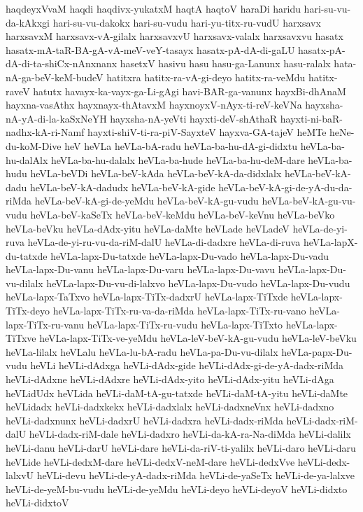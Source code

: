 {haqdeyxVvaM
haqdi
haqdivx-yukatxM
haqtA
haqtoV
haraDi
haridu
hari-su-vu-da-kAkxgi
hari-su-vu-dakokx
hari-su-vudu
hari-yu-titx-ru-vudU
harxsavx
harxsavxM
harxsavx-vA-gilalx
harxsavxvU
harxsavx-valalx
harxsavxvu
hasatx
hasatx-mA-taR-BA-gA-vA-meV-veY-tasayx
hasatx-pA-dA-di-gaLU
hasatx-pA-dA-di-ta-shiCx-nAnxnanx
hasetxV
hasivu
hasu
hasu-ga-Lanunx
hasu-ralalx
hata-nA-ga-beV-keM-budeV
hatitxra
hatitx-ra-vA-gi-deyo
hatitx-ra-veMdu
hatitx-raveV
hatutx
havayx-ka-vayx-ga-Li-gAgi
havi-BAR-ga-vanunx
hayxBi-dhAnaM
hayxna-vasAthx
hayxnayx-thAtavxM
hayxnoyxV-nAyx-ti-reV-keVNa
hayxsha-nA-yA-di-la-kaSxNeYH
hayxsha-nA-yeVti
hayxti-deV-shAthaR
hayxti-ni-baR-nadhx-kA-ri-Namf
hayxti-shiV-ti-ra-piV-SayxteV
hayxva-GA-tajeV
heMTe
heNe-du-koM-Dive
heV
heVLa
heVLa-bA-radu
heVLa-ba-hu-dA-gi-didxtu
heVLa-ba-hu-dalAlx
heVLa-ba-hu-dalalx
heVLa-ba-hude
heVLa-ba-hu-deM-dare
heVLa-ba-hudu
heVLa-beVDi
heVLa-beV-kAda
heVLa-beV-kA-da-didxlalx
heVLa-beV-kA-dadu
heVLa-beV-kA-dadudx
heVLa-beV-kA-gide
heVLa-beV-kA-gi-de-yA-du-da-riMda
heVLa-beV-kA-gi-de-yeMdu
heVLa-beV-kA-gu-vudu
heVLa-beV-kA-gu-vu-vudu
heVLa-beV-kaSeTx
heVLa-beV-keMdu
heVLa-beV-keVnu
heVLa-beVko
heVLa-beVku
heVLa-dAdx-yitu
heVLa-daMte
heVLade
heVLadeV
heVLa-de-yi-ruva
heVLa-de-yi-ru-vu-da-riM-dalU
heVLa-di-dadxre
heVLa-di-ruva
heVLa-lapX-du-tatxde
heVLa-lapx-Du-tatxde
heVLa-lapx-Du-vado
heVLa-lapx-Du-vadu
heVLa-lapx-Du-vanu
heVLa-lapx-Du-varu
heVLa-lapx-Du-vavu
heVLa-lapx-Du-vu-dilalx
heVLa-lapx-Du-vu-di-lalxvo
heVLa-lapx-Du-vudo
heVLa-lapx-Du-vudu
heVLa-lapx-TaTxvo
heVLa-lapx-TiTx-dadxrU
heVLa-lapx-TiTxde
heVLa-lapx-TiTx-deyo
heVLa-lapx-TiTx-ru-va-da-riMda
heVLa-lapx-TiTx-ru-vano
heVLa-lapx-TiTx-ru-vanu
heVLa-lapx-TiTx-ru-vudu
heVLa-lapx-TiTxto
heVLa-lapx-TiTxve
heVLa-lapx-TiTx-ve-yeMdu
heVLa-leV-beV-kA-gu-vudu
heVLa-leV-beVku
heVLa-lilalx
heVLalu
heVLa-lu-bA-radu
heVLa-pa-Du-vu-dilalx
heVLa-papx-Du-vudu
heVLi
heVLi-dAdxga
heVLi-dAdx-gide
heVLi-dAdx-gi-de-yA-dadx-riMda
heVLi-dAdxne
heVLi-dAdxre
heVLi-dAdx-yito
heVLi-dAdx-yitu
heVLi-dAga
heVLidUdx
heVLida
heVLi-daM-tA-gu-tatxde
heVLi-daM-tA-yitu
heVLi-daMte
heVLidadx
heVLi-dadxkekx
heVLi-dadxlalx
heVLi-dadxneVnx
heVLi-dadxno
heVLi-dadxnunx
heVLi-dadxrU
heVLi-dadxra
heVLi-dadx-riMda
heVLi-dadx-riM-dalU
heVLi-dadx-riM-dale
heVLi-dadxro
heVLi-da-kA-ra-Na-diMda
heVLi-dalilx
heVLi-danu
heVLi-darU
heVLi-dare
heVLi-da-riV-ti-yalilx
heVLi-daro
heVLi-daru
heVLide
heVLi-dedxM-dare
heVLi-dedxV-neM-dare
heVLi-dedxVve
heVLi-dedx-lalxvU
heVLi-devu
heVLi-de-yA-dadx-riMda
heVLi-de-yaSeTx
heVLi-de-ya-lalxve
heVLi-de-yeM-bu-vudu
heVLi-de-yeMdu
heVLi-deyo
heVLi-deyoV
heVLi-didxto
heVLi-didxtoV
}
